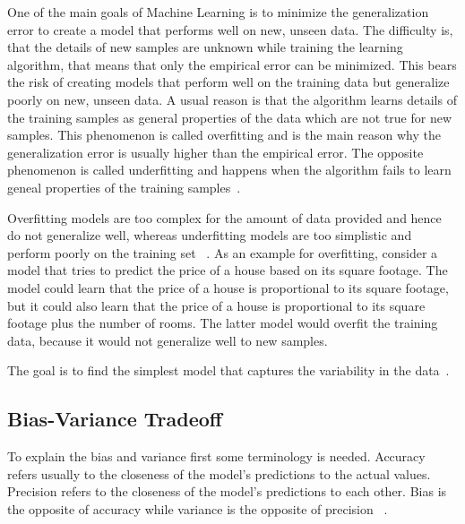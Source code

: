 One of the main goals of Machine Learning is to minimize the generalization error to create a model that performs well
on new, unseen data.
The difficulty is, that the details of new samples are unknown while training the learning algorithm, that means that
only the empirical error can be minimized.
This bears the risk of creating models that perform well on the training data but generalize poorly on new, unseen data.
A usual reason is that the algorithm learns details of the training samples as general properties of the data
which are not true for new samples.
This phenomenon is called overfitting and is the main reason why the generalization error is usually higher than the
empirical error.
The opposite phenomenon is called underfitting and happens when the algorithm fails to learn geneal properties of
the training samples~\cite[p. 26]{zhou_machinelearning_2021}.


Overfitting models are too complex for the amount of data provided and hence do not generalize well, whereas
underfitting models are too simplistic and perform poorly on the training set
~\cite[p. 28]{muller_introductionmachinelearning_2016}.
As an example for overfitting, consider a model that tries to predict the price of a house based on its square footage.
The model could learn that the price of a house is proportional to its square footage, but it could also learn that the
price of a house is proportional to its square footage plus the number of rooms.
The latter model would overfit the training data, because it would not generalize well to new samples.

The goal is to find the simplest model that captures the variability in the
data~\cite[p. 35]{muller_introductionmachinelearning_2016}.

\subsection{Bias-Variance Tradeoff}\label{subsec:bias-variance-tradeoff}
To explain the bias and variance first some terminology is needed.
Accuracy refers usually to the closeness of the model's predictions to the actual values.
Precision refers to the closeness of the model's predictions to each other.
Bias is the opposite of accuracy while variance is the opposite of precision
~\cite[p. 2]{doroudi2020bias}.

